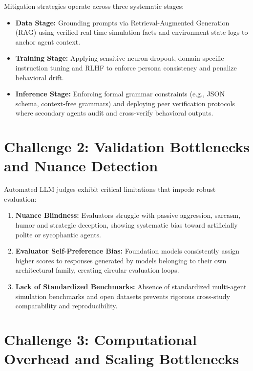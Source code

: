 \documentclass[12pt,a4paper]{report}
\begin{document}
Mitigation strategies operate across three systematic stages:
\begin{itemize}
    \item \textbf{Data Stage:} Grounding prompts via Retrieval-Augmented Generation (RAG) using verified real-time simulation facts and environment state logs to anchor agent context.
    \item \textbf{Training Stage:} Applying sensitive neuron dropout, domain-specific instruction tuning and RLHF to enforce persona consistency and penalize behavioral drift.
    \item \textbf{Inference Stage:} Enforcing formal grammar constraints (e.g., JSON schema, context-free grammars) and deploying peer verification protocols where secondary agents audit and cross-verify behavioral outputs.
\end{itemize}

\section{Challenge 2: Validation Bottlenecks and Nuance Detection}
\label{sec:val_bottlenecks}

Automated LLM judges exhibit critical limitations that impede robust evaluation:
\begin{enumerate}[label=\arabic*.]
    \item \textbf{Nuance Blindness:} Evaluators struggle with passive aggression, sarcasm, humor and strategic deception, showing systematic bias toward artificially polite or sycophantic agents.
    \item \textbf{Evaluator Self-Preference Bias:} Foundation models consistently assign higher scores to responses generated by models belonging to their own architectural family, creating circular evaluation loops.
    \item \textbf{Lack of Standardized Benchmarks:} Absence of standardized multi-agent simulation benchmarks and open datasets prevents rigorous cross-study comparability and reproducibility.
\end{enumerate}

\section{Challenge 3: Computational Overhead and Scaling Bottlenecks}
\label{sec:comp_bottlenecks}
\end{document}
